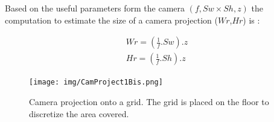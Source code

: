 Based on the useful parameters form the camera $(f ,Sw\times Sh ,z)$ the computation to estimate the size of a camera projection ($Wr$,$Hr$) is :

%

	
	
	\begin{equation} \label{eq:WrHr1}
	\begin{split}
			Wr=(\frac{1}{f} . Sw).z\\
			Hr=(\frac{1}{f} . Sh).z
     \end{split} 
	\end{equation}
	
	\begin{figure}[t!]
		\centering
  		\texttt{[image: img/CamProject1Bis.png]}
  
 	 	\endminipage\hfill\caption{Camera projection onto a grid. The grid is placed on the floor to discretize 	the area covered.}\label{fig:cam_proj}
	\end{figure}



